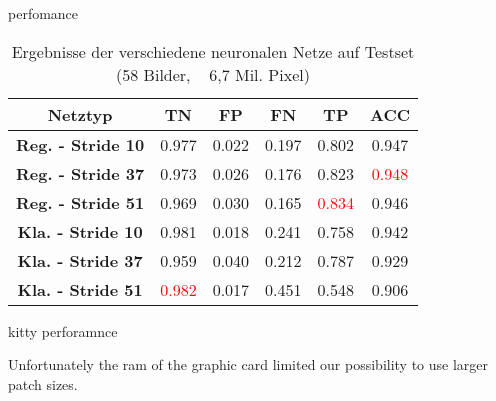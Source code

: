 perfomance
      \begin{table}[h!]
  \begin{center}
    \label{tab:table1}
    \begin{tabular}{c|ccccc}
    \toprule
      \textbf{Netztyp} & \textbf{TN} & \textbf{FP} & \textbf{FN} & \textbf{TP} & \textbf{ACC} \\
       \midrule
      \textbf{Reg. - Stride 10} & 0.977 & 0.022 & 0.197 & 0.802 & 0.947\\
      \textbf{Reg. - Stride 37} & 0.973 & 0.026 & 0.176 & 0.823 &  \textcolor{red}{0.948}\\ 
      \textbf{Reg. - Stride 51} & 0.969 & 0.030 & 0.165 & \textcolor{red}{0.834} & 0.946\\
      \midrule
      \textbf{Kla. - Stride 10} & 0.981 & 0.018 & 0.241 & 0.758 & 0.942\\
      \textbf{Kla. - Stride 37} & 0.959 & 0.040 & 0.212 & 0.787 & 0.929\\
      \textbf{Kla. - Stride 51} & \textcolor{red}{0.982} & 0.017 & 0.451 & 0.548 & 0.906\\
      \bottomrule
    \end{tabular}
    \caption{Ergebnisse der verschiedene neuronalen Netze auf Testset (58 Bilder, ~ 6,7 Mil. Pixel)}
  \end{center}
\end{table}

kitty perforamnce


Unfortunately the ram of the graphic card limited our possibility to use larger patch sizes.
